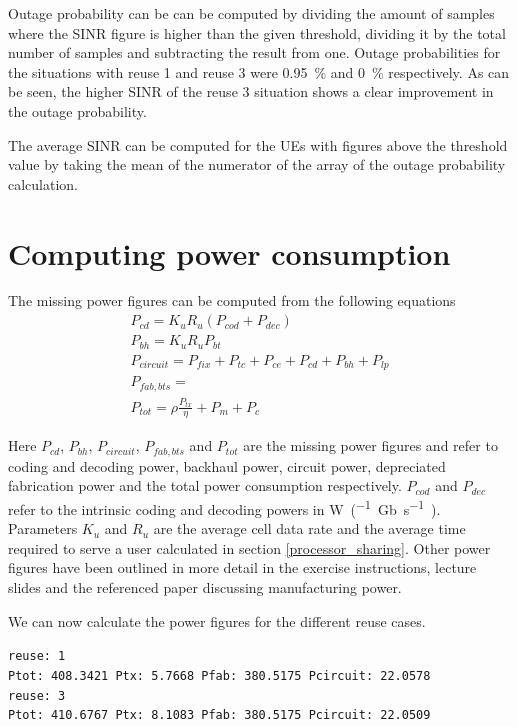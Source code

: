 \documentclass{article}
\begin{document}
Outage probability can be can be computed by dividing the amount of samples where the SINR figure is higher than the given threshold, dividing it by the total number of samples and subtracting the result from one. Outage probabilities for the situations with reuse 1 and reuse 3 were 0.95\ \% and 0\ \% respectively. As can be seen, the higher SINR of the reuse 3 situation shows a clear improvement in the outage probability.

The average SINR can be computed for the UEs with figures above the threshold value by taking the mean of the numerator of the array of the outage probability calculation.

\section{Computing power consumption}
The missing power figures can be computed from the following equations
\begin{gather*}
    P_{cd} = K_u R_u (P_{cod} + P_{dec}) \\
    P_{bh} = K_u R_u P_{bt} \\
    P_{circuit} = P_{fix} + P_{tc} + P_{ce} + P_{cd} + P_{bh} + P_{lp} \\
    P_{fab,bts} = \\
    P_{tot} =\rho \frac{P_{tx}}{\eta} + P_{m} + P_{c}
\end{gather*}

Here \(P_{cd}\), \(P_{bh}\), \(P_{circuit}\), \(P_{fab,bts}\) and \(P_{tot}\) are the missing power figures and refer to coding and decoding power, backhaul power, circuit power, depreciated fabrication power and the total power consumption respectively. \(P_{cod}\) and \(P_{dec}\) refer to the intrinsic coding and decoding powers in \si{\watt\per(\giga b\per\second)}. Parameters \(K_u\) and \(R_u\) are the average cell data rate and the average time required to serve a user calculated in section \ref{processor_sharing}. Other power figures have been outlined in more detail in the exercise instructions, lecture slides and the referenced paper discussing manufacturing power.

We can now calculate the power figures for the different reuse cases.

\texttt{reuse: 1 \\
Ptot: 408.3421 Ptx: 5.7668 Pfab: 380.5175 Pcircuit: 22.0578 \\
reuse: 3 \\
Ptot: 410.6767 Ptx: 8.1083 Pfab: 380.5175 Pcircuit: 22.0509}
\end{document}
